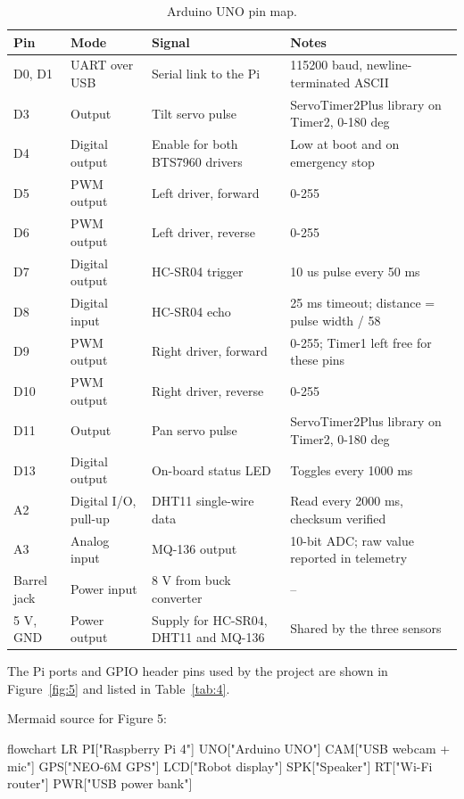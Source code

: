 \begin{table}[!t]
\centering
\caption{Arduino UNO pin map.}
\label{tab:3}
\begin{tabularx}{\linewidth}{l l l X}
\toprule
Pin & Mode & Signal & Notes \\
\midrule
D0, D1 & UART over USB & Serial link to the Pi & 115200 baud, newline-terminated ASCII \\
D3 & Output & Tilt servo pulse & ServoTimer2Plus library on Timer2, 0-180 deg \\
D4 & Digital output & Enable for both BTS7960 drivers & Low at boot and on emergency stop \\
D5 & PWM output & Left driver, forward & 0-255 \\
D6 & PWM output & Left driver, reverse & 0-255 \\
D7 & Digital output & HC-SR04 trigger & 10 us pulse every 50 ms \\
D8 & Digital input & HC-SR04 echo & 25 ms timeout; distance = pulse width / 58 \\
D9 & PWM output & Right driver, forward & 0-255; Timer1 left free for these pins \\
D10 & PWM output & Right driver, reverse & 0-255 \\
D11 & Output & Pan servo pulse & ServoTimer2Plus library on Timer2, 0-180 deg \\
D13 & Digital output & On-board status LED & Toggles every 1000 ms \\
A2 & Digital I/O, pull-up & DHT11 single-wire data & Read every 2000 ms, checksum verified \\
A3 & Analog input & MQ-136 output & 10-bit ADC; raw value reported in telemetry \\
Barrel jack & Power input & 8 V from buck converter & -- \\
5 V, GND & Power output & Supply for HC-SR04, DHT11 and MQ-136 & Shared by the three sensors \\
\bottomrule
\end{tabularx}
\end{table}

The Pi ports and GPIO header pins used by the project are shown in Figure~\ref{fig:5} and listed in Table~\ref{tab:4}.

\iffalse
Mermaid source for Figure 5:

flowchart LR
  PI["Raspberry Pi 4"]
  UNO["Arduino UNO"]
  CAM["USB webcam + mic"]
  GPS["NEO-6M GPS"]
  LCD["Robot display"]
  SPK["Speaker"]
  RT["Wi-Fi router"]
  PWR["USB power bank"]

